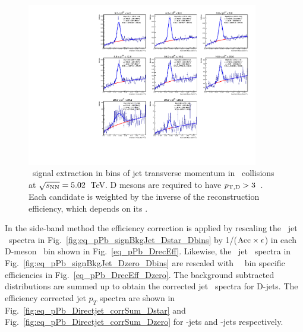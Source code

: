 \begin{figure}[bth]
\centering
\includegraphics[width=0.9\textwidth]{pPbplots/plotsEffScale_pt3_noDetails/invMass_FASTwoSDD}
\caption{\Dstar\ signal extraction in bins of jet transverse momentum in \pPb\ collisions at $\sqrt{s_{\rm NN}}=5.02$~TeV. D mesons are required to have $p_{\mathrm{T,D}}>3$~\GeVc.
Each candidate is weighted by the inverse of the reconstruction efficiency, which depends on its \ptd.}
\label{fig:eq_pPb_Directjet_corrInv_Dstar}
\end{figure}

%


In the side-band method the efficiency correction is applied by rescaling the \Dstar\ jet \pt\ spectra in Fig.~\ref{fig:eq_pPb_signBkgJet_Dstar_Dbins} 
by 1/(${\rm Acc} \times \epsilon$) in each D-meson \pt\ bin shown in Fig.~\ref{eq_pPb_DrecEff}.
Likewise, the \Dzero\ jet \pt\ spectra in Fig.~\ref{fig:eq_pPb_signBkgJet_Dzero_Dbins} are rescaled with \Dzero\ \pt\ bin specific efficiencies in Fig.~\ref{eq_pPb_DrecEff_Dzero}.
The background subtracted distributions are summed up to obtain the corrected jet \pt\ spectra for D-jets. 
The efficiency corrected jet $p_{T}$ spectra are shown in Fig.~\ref{fig:eq_pPb_Directjet_corrSum_Dstar} and Fig.~\ref{fig:eq_pPb_Directjet_corrSum_Dzero} for \Dstar-jets and \Dzero-jets respectively.

